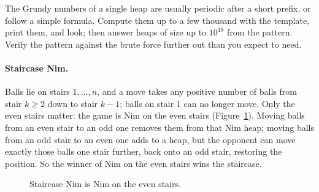 \begin{trick}
The Grundy numbers of a single heap are usually periodic after a short prefix, or follow a simple formula. Compute them up to a few
thousand with the template, print them, and look; then answer heaps of size up to $10^{18}$ from the pattern. Verify the pattern
against the brute force further out than you expect to need.
\end{trick}

\paragraph{Staircase Nim.} Balls lie on stairs $1, \dots, n$, and a move takes any positive number of balls from stair $k \ge 2$ down
to stair $k - 1$; balls on stair 1 can no longer move. Only the even stairs matter: the game is Nim on the even stairs
(Figure~\ref{fig:stairnim}). Moving balls from an even stair to an odd one removes them from that Nim heap; moving balls from an odd stair
to an even one adds to a heap, but the opponent can move exactly those balls one stair further, back onto an odd stair, restoring the
position. So the winner of Nim on the even stairs wins the staircase.

\begin{figure}[htbp]
\centering
{}
\caption{Staircase Nim is Nim on the even stairs.}
\label{fig:stairnim}
\end{figure}


